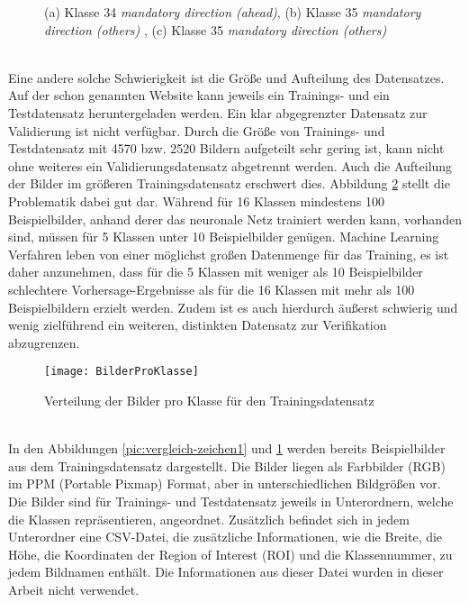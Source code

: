 \begin{figure} [ht]
	\centering
	\subfloat[][]{\texttt{[image: 34]}}%
	\qquad
	\subfloat[][]{\texttt{[image: 35]}}%
	\qquad
	\subfloat[][]{\texttt{[image: 35-2]}}%
	\caption{(a) Klasse 34 \textit{mandatory direction (ahead)}, (b) Klasse 35 \textit{mandatory direction (others)} , (c) Klasse 35 \textit{mandatory direction (others)}}%
	\label{pic:vergleich-zeichen2}
\end{figure} \ \\
%
Eine andere solche Schwierigkeit ist die Größe und Aufteilung des Datensatzes. Auf der schon genannten Website kann jeweils ein Trainings- und ein Testdatensatz heruntergeladen werden. Ein klar abgegrenzter Datensatz zur Validierung ist nicht verfügbar. Durch die Größe von Trainings- und Testdatensatz mit 4570 bzw. 2520 Bildern aufgeteilt sehr gering ist, kann nicht ohne weiteres ein Validierungsdatensatz abgetrennt werden. Auch die Aufteilung der Bilder im größeren Trainingsdatensatz erschwert dies. Abbildung \ref{pic:picsproclass} stellt die Problematik dabei gut dar. Während für 16 Klassen mindestens 100 Beispielbilder, anhand derer das neuronale Netz trainiert werden kann, vorhanden sind, müssen für 5 Klassen unter 10 Beispielbilder genügen. Machine Learning Verfahren leben von einer möglichst großen Datenmenge für das Training, es ist daher anzunehmen, dass für die 5 Klassen mit weniger als 10 Beispielbilder schlechtere Vorhersage-Ergebnisse als für die 16 Klassen mit mehr als 100 Beispielbildern erzielt werden. Zudem ist es auch hierdurch äußerst schwierig und wenig zielführend ein weiteren, distinkten Datensatz zur Verifikation abzugrenzen. 

\begin{figure} [ht]
	\centering
	\texttt{[image: BilderProKlasse]}
	\caption{Verteilung der Bilder pro Klasse für den Trainingsdatensatz}
	\label{pic:picsproclass}
\end{figure} \ \\
%
In den Abbildungen \ref{pic:vergleich-zeichen1} und \ref{pic:vergleich-zeichen2} werden bereits Beispielbilder aus dem Trainingsdatensatz dargestellt. Die Bilder liegen als Farbbilder (RGB) im PPM (Portable Pixmap) Format, aber in unterschiedlichen Bildgrößen vor. Die Bilder sind für Trainings- und Testdatensatz jeweils in Unterordnern, welche die Klassen repräsentieren, angeordnet. Zusätzlich befindet sich in jedem Unterordner eine CSV-Datei, die zusätzliche Informationen, wie die Breite, die Höhe, die Koordinaten der Region of Interest (ROI) und die Klassennummer, zu jedem Bildnamen enthält. Die Informationen aus dieser Datei wurden in dieser Arbeit nicht verwendet.

